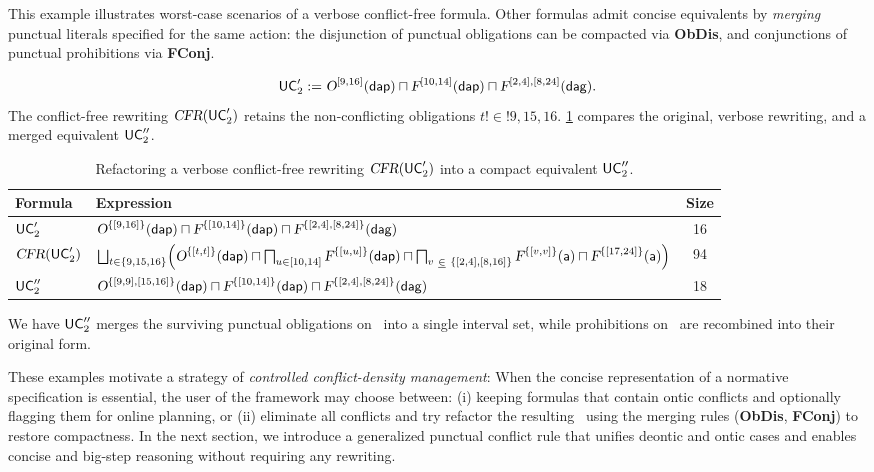 This example illustrates worst-case scenarios of a verbose conflict-free formula. Other formulas admit concise equivalents by \emph{merging} punctual literals specified for the same action: the disjunction of punctual obligations can be compacted via \textbf{ObDis}, and conjunctions of punctual prohibitions via \textbf{FConj}.

\begin{example}
\[
\mathsf{UC}_2' :=
\textsl{O}^{{[9,16]}}(\mathsf{\mathsf{dap}})
\sqcap
\textsl{F}^{{[10,14]}}(\mathsf{\mathsf{dap}})
\sqcap
\textsl{F}^{{[2,4],[8,24]}}(\mathsf{\mathsf{dag}}).
\]
The conflict-free rewriting $\textsl{CFR}(\mathsf{UC}_2')$ retains the non-conflicting obligations $t!\in!{9,15,16}$.
\ref{table:refactoring-uc2} compares the original, verbose rewriting, and a merged equivalent $\mathsf{UC}_2''$.

\begin{table}[h]
\centering
\renewcommand{\arraystretch}{1.4}
\begin{tabular}{|l|p{10.2cm}|c|}
\hline
\textbf{Formula} & \textbf{Expression} & \textbf{Size} \\ \hline
$\mathsf{UC}_2'$ 
& $\textsl{O}^{\{[9,16]\}}(\mathsf{\mathsf{dap}})\sqcap
   \textsl{F}^{\{[10,14]\}}(\mathsf{\mathsf{dap}})\sqcap
   \textsl{F}^{\{[2,4],[8,24]\}}(\mathsf{\mathsf{dag}})$
& 16 \\ \hline
$\textsl{CFR}(\mathsf{UC}_2')$
& $\bigsqcup_{t\in\{9,15,16\}}\!
  \Big(\textsl{O}^{\{[t,t]\}}(\mathsf{\mathsf{dap}})\sqcap
  \bigsqcap_{u\in[10,14]}\textsl{F}^{\{[u,u]\}}(\mathsf{\mathsf{dap}})\sqcap
  \bigsqcap_{v~\underline{\in}~\{[2,4],[8,16]\}}\textsl{F}^{\{[v,v]\}}(\mathsf{a})\sqcap
  \textsl{F}^{\{[17,24]\}}(\mathsf{a})\Big)$
& 94 \\ \hline
$\mathsf{UC}_2''$
& $\textsl{O}^{\{[9,9],[15,16]\}}(\mathsf{\mathsf{dap}})\sqcap
   \textsl{F}^{\{[10,14]\}}(\mathsf{\mathsf{dap}})\sqcap
   \textsl{F}^{\{[2,4],[8,24]\}}(\mathsf{\mathsf{dag}})$
& 18 \\ \hline
\end{tabular}
\caption{Refactoring a verbose conflict-free rewriting $\textsl{CFR}(\mathsf{UC}_2')$ into a compact equivalent $\mathsf{UC}_2''$.}
\label{table:refactoring-uc2}
\end{table}
We have $\mathsf{UC}_2''$ merges the surviving punctual obligations on \delAtPark\ into a single interval set, while prohibitions on \delAtGate\ are recombined into their original form.
\end{example}

These examples motivate a strategy of \emph{controlled conflict-density management}:
When the concise representation of a normative specification is essential, the user of the framework may choose between:
(i) keeping formulas that contain ontic conflicts and optionally flagging them for online planning, or
(ii) eliminate all conflicts and try refactor the resulting \dpnf\ using the merging rules (\textbf{ObDis}, \textbf{FConj}) to restore compactness.
In the next section, we introduce a generalized punctual conflict rule that unifies deontic and ontic cases and enables concise and big-step reasoning without requiring any \dpnf rewriting.
